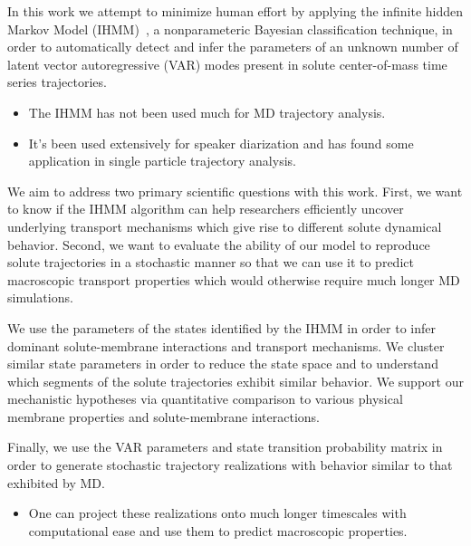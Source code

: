 \documentclass[journal=jpcbfk,manuscript=article]{achemso}
\begin{document}
  In this work we attempt to minimize human effort by applying the infinite hidden 
  Markov Model (IHMM)~\cite{beal_infinite_2002,calderon_inferring_2015}, a nonparameteric 
  Bayesian classification technique, in order to automatically detect and infer the 
  parameters of an unknown number of latent vector autoregressive (VAR) modes present 
  in solute center-of-mass time series trajectories. 
  \begin{itemize}
    \item The IHMM has not been used much for MD trajectory analysis.
    \item It's been used extensively for speaker diarization and has found some application
    in single particle trajectory analysis.
  \end{itemize}
  
  We aim to address two primary scientific 
  questions with this work. 
  First, we want
  to know if the IHMM algorithm can help researchers efficiently uncover underlying
  transport mechanisms which give rise to different solute dynamical behavior.
  Second, we want to evaluate the ability of our model to reproduce solute trajectories
  in a stochastic manner so that we can use it to predict macroscopic transport 
  properties which would otherwise require much longer MD simulations.
  
  We use the parameters of the states identified by the IHMM in order to infer 
  dominant solute-membrane interactions and transport mechanisms. We cluster similar 
  state parameters in order to reduce the state space and to understand which segments 
  of the solute trajectories exhibit similar behavior. We support our mechanistic 
  hypotheses via quantitative comparison to various physical membrane properties and
  solute-membrane interactions.
  
  Finally, we use the VAR parameters and state transition probability matrix in
  order to generate stochastic trajectory realizations with behavior similar to that
  exhibited by MD. 
  \begin{itemize}  
    \item One can project these realizations onto much longer timescales with 
    computational ease and use them to predict macroscopic properties.
  \end{itemize}
  
\end{document}
